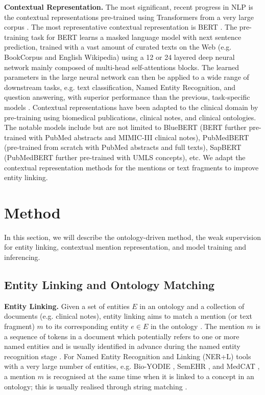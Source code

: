 \documentclass[twocolumn]{bmcart}
\begin{document}
\textbf{Contextual Representation.} The most significant, recent progress in NLP is the contextual representations pre-trained using Transformers \cite{vaswani2017attention} from a very large corpus \cite{devlin-etal-2019-bert}. The most representative contextual representation is BERT \cite{devlin-etal-2019-bert}. The pre-training task for BERT learns a masked language model with next sentence prediction, trained with a vast amount of curated texts on the Web (e.g. BookCorpus and English Wikipedia) using a 12 or 24 layered deep neural network mainly composed of multi-head self-attentions blocks. The learned parameters in the large neural network can then be applied to a wide range of downstream tasks, e.g. text classification, Named Entity Recognition, and question answering, with superior performance than the previous, task-specific models \cite{devlin-etal-2019-bert}. Contextual representations have been adapted to the clinical domain by pre-training using biomedical publications, clinical notes, and clinical ontologies. The notable models include but are not limited to BlueBERT \cite{peng2019transfer} (BERT further pre-trained with PubMed abstracts and MIMIC-III clinical notes), PubMedBERT \cite{Gu2021} (pre-trained from scratch with PubMed abstracts and full texts), SapBERT \cite{liu2021sap} (PubMedBERT further pre-trained with UMLS concepts), etc. We adapt the contextual representation methods for the mentions or text fragments to improve entity linking.

\section*{Method}
\label{sec:method}

In this section, we will describe the ontology-driven method, the weak supervision for entity linking, contextual mention representation, and model training and inferencing.

\subsection*{Entity Linking and Ontology Matching}

\textbf{Entity Linking.} Given a set of entities $E$ in an ontology and a collection of documents (e.g. clinical notes), entity linking aims to match a mention (or text fragment) $m$ to its corresponding entity $e \in E$ in the ontology \cite{shen2015}. The mention $m$ is a sequence of tokens in a document which potentially refers to one or more named entities and is usually identified in advance during the named entity recognition stage \cite{shen2015}. For Named Entity Recognition and Linking (NER+L) tools with a very large number of entities, e.g. Bio-YODIE \cite{gorrell2018}, SemEHR \cite{Wu2018semehr}, and MedCAT \cite{Kraljevic2021}, a mention $m$ is recognised at the same time when it is linked to a concept in an ontology; this is usually realised through string matching \cite{gorrell2018,Kraljevic2021}.
\end{document}
